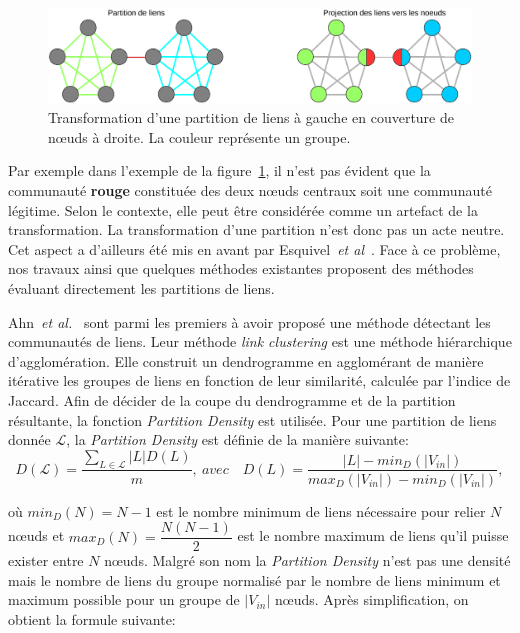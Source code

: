 \begin{figure}
\centering
\includegraphics[width=0.9\linewidth]{img/ExpectedNodes/Partition_Couverture}
\caption{Transformation d'une partition de liens à gauche en couverture de n\oe{}uds à droite. La couleur représente un groupe.}
\label{fig:Partition_Couverture}
\end{figure}


Par exemple dans l'exemple de la figure~\ref{fig:Partition_Couverture}, il n'est pas évident que la communauté \textcolor{briquered}{\textbf{rouge}} constituée des deux n\oe{}uds centraux soit une communauté légitime.
Selon le contexte, elle peut être considérée comme un artefact de la transformation.
La transformation d'une partition n'est donc pas un acte neutre.
Cet aspect a d'ailleurs été mis en avant par Esquivel~\emph{et al}~\cite{Esquivel2011}.
Face à ce problème, nos travaux ainsi que quelques méthodes existantes proposent des méthodes évaluant directement les partitions de liens.

Ahn~\emph{et al.}~\cite{Ahn2010a} sont parmi les premiers à avoir proposé une méthode détectant les communautés de liens.
Leur méthode \emph{link clustering} est une méthode hiérarchique d'agglomération.
Elle construit un dendrogramme en agglomérant de manière itérative les groupes de liens en fonction de leur similarité, calculée par l'indice de Jaccard.
Afin de décider de la coupe du dendrogramme et de la partition résultante, la fonction \emph{Partition Density} est utilisée.
Pour une partition de liens donnée $\mathcal{L}$, la \emph{Partition Density} est définie de la manière suivante:
\begin{equation}
D(\mathcal{L}) = \dfrac{\sum_{L \in \mathcal{L}}|L|D(L)}{m},\ avec \quad  D(L) = \dfrac{|L|- min_D(|V_{in}|) }{max_D(|V_{in}|) - min_D(|V_{in}|)},
\end{equation}

où $min_D(N) = N - 1$ est le nombre minimum de liens nécessaire pour relier $N$ n\oe{}uds et $max_D(N) = \dfrac{N(N - 1)}{2}$ est le nombre maximum de liens qu'il puisse exister entre $N$ n\oe{}uds.
Malgré son nom la \emph{Partition Density} n'est pas une densité mais le nombre de liens du groupe normalisé par le nombre de liens minimum et maximum possible pour un groupe de $|V_{in}|$ n\oe{}uds.
Après simplification, on obtient la formule suivante:

